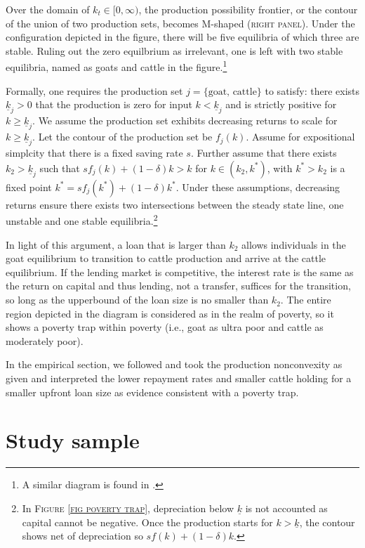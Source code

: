 	Over the domain of $k_{t}\in[0, \infty)$, the production possibility frontier, or the contour of the union of two production sets, becomes M-shaped (\textsc{right panel}). Under the configuration depicted in the figure, there will be five equilibria of which three are stable. Ruling out the zero equilbrium as irrelevant, one is left with two stable equilibria, named as goats and cattle in the figure.\footnote{A similar diagram is found in \citet[][Figure 3, with $k-y$ space]{KraayMcKenzie2014}. }

	Formally, one requires the production set $j=\{\mbox{goat, cattle}\}$ to satisfy: there exists $\underline{k}_{j}>0$ that the production is zero for input $k<\underline{k}_{j}$ and is strictly positive for $k\geqslant\underline{k}_{j}$. We assume the production set exhibits decreasing returns to scale for $k\geqslant\underline{k}_{j}$. Let the contour of the production set be $f_{j}(k)$. Assume for expositional simplcity that there is a fixed saving rate $s$. Further assume that there exists $k_{2}>\underline{k}_{j}$ such that $sf_{j}(k)+(1-\delta)k>k$ for $k\in(k_{2}, k^{*})$, with $k^{*}>k_{2}$ is a fixed point $k^{*}=sf_{j}(k^{*})+(1-\delta)k^{*}$. Under these assumptions, decreasing returns ensure there exists two intersections between the steady state line, one unstable and one stable equilibria.\footnote{In \textsc{Figure \ref{fig poverty trap}}, depreciation below $\underline{k}$ is not accounted as capital cannot be negative. Once the production starts for $k>\underline{k}$, the contour shows net of depreciation so $sf(k)+(1-\delta)k$. } 

	In light of this argument, a loan that is larger than $k_{2}$ allows individuals in the goat equilibrium to transition to cattle production and arrive at the cattle equilibrium. If the lending market is competitive, the interest rate is the same as the return on capital and thus lending, not a transfer, suffices for the transition, so long as the upperbound of the loan size is no smaller than $k_{2}$. The entire region depicted in the diagram is considered as in the realm of poverty, so it shows a poverty trap within poverty (i.e., goat as ultra poor and cattle as moderately poor). 

	In the empirical section, we followed \citet{BandieraBRAC2017} and took the production nonconvexity as given and interpreted the lower repayment rates and smaller cattle holding for a smaller upfront loan size as evidence consistent with a poverty trap. 

\section{Study sample}
\label{SecStudySample}

